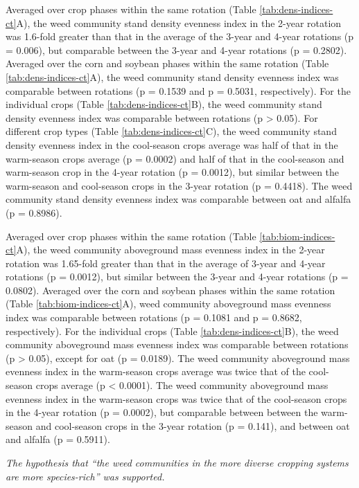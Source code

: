 \documentclass[
]{article}
\begin{document}
Averaged over crop phases within the same rotation (Table \ref{tab:dens-indices-ct}A), the weed community stand density evenness index in the 2-year rotation was 1.6-fold greater than that in the average of the 3-year and 4-year rotations (p = 0.006), but comparable between the 3-year and 4-year rotations (p = 0.2802). Averaged over the corn and soybean phases within the same rotation (Table \ref{tab:dens-indices-ct}A), the weed community stand density evenness index was comparable between rotations (p = 0.1539 and p = 0.5031, respectively). For the individual crops (Table \ref{tab:dens-indices-ct}B), the weed community stand density evenness index was comparable between rotations (p \textgreater{} 0.05). For different crop types (Table \ref{tab:dens-indices-ct}C), the weed community stand density evenness index in the cool-season crops average was half of that in the warm-season crops average (p = 0.0002) and half of that in the cool-season and warm-season crop in the 4-year rotation (p = 0.0012), but similar between the warm-season and cool-season crops in the 3-year rotation (p = 0.4418). The weed community stand density evenness index was comparable between oat and alfalfa (p = 0.8986).

Averaged over crop phases within the same rotation (Table \ref{tab:biom-indices-ct}A), the weed community aboveground mass evenness index in the 2-year rotation was 1.65-fold greater than that in the average of 3-year and 4-year rotations (p = 0.0012), but similar between the 3-year and 4-year rotations (p = 0.0802). Averaged over the corn and soybean phases within the same rotation (Table \ref{tab:biom-indices-ct}A), weed community aboveground mass evenness index was comparable between rotations (p = 0.1081 and p = 0.8682, respectively). For the individual crops (Table \ref{tab:dens-indices-ct}B), the weed community aboveground mass evenness index was comparable between rotations (p \textgreater{} 0.05), except for oat (p = 0.0189). The weed community aboveground mass evenness index in the warm-season crops average was twice that of the cool-season crops average (p \textless{} 0.0001). The weed community aboveground mass evenness index in the warm-season crops was twice that of the cool-season crops in the 4-year rotation (p = 0.0002), but comparable between between the warm-season and cool-season crops in the 3-year rotation (p = 0.141), and between oat and alfalfa (p = 0.5911).

\emph{The hypothesis that ``the weed communities in the more diverse cropping systems are more species-rich'' was supported.}
\end{document}
